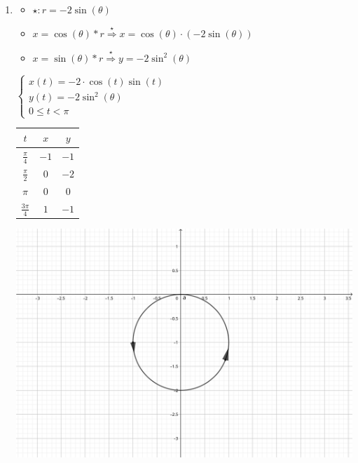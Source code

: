 \documentclass[../practica_02.tex]{subfiles}
\begin{document}
    \begin{enumerate}
        \item
            \begin{itemize}
                \item $\star: r = -2\sin(\theta)$
                \item $ x = \cos(\theta)*r \stackrel{\star}{\Rightarrow} x = \cos(\theta)\cdot(-2\sin(\theta))$
                \item $ x = \sin(\theta)*r \stackrel{\star}{\Rightarrow} y = -2\sin^{2}(\theta)$
            \end{itemize}

            \quad $\left\{
                \begin{array}{ll}
                    x(t) = -2\cdot\cos(t)\sin(t)\\
                    y(t) = -2\sin^{2}(\theta)\\
                    0 \leq t < \pi
                \end{array}
            \right.$

            \begin{tabular}{ c|c|c } 
                \hline
                    $t$                 & $x$  & $y$ \\
                \hline
                    $\frac{\pi}{4}$     & $-1$ & $-1$ \\ 
                    $\frac{\pi}{2}$     & $0 $ & $-2$ \\ 
                    $\pi$               & $0 $ & $0 $ \\ 
                    $\frac{3\pi}{4}$    & $1 $ & $-1$ \\
                \hline
            \end{tabular}

            \includegraphics[scale=0.8]{ej04/resources/a.png} $ $


\end{enumerate}
\end{document}
